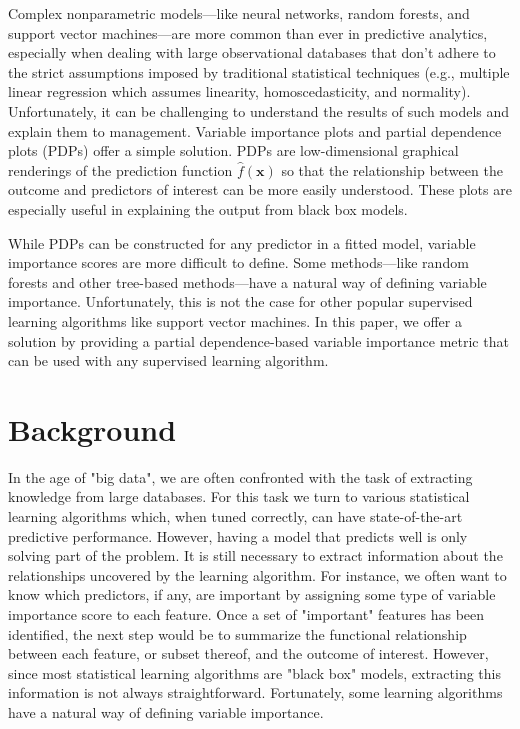 \documentclass[12pt]{article}
\begin{document}
Complex nonparametric models---like neural networks, random forests, and support vector machines---are more common than ever in predictive analytics, especially when dealing with large observational databases that don't adhere to the strict assumptions imposed by traditional statistical techniques (e.g., multiple linear regression which assumes linearity, homoscedasticity, and normality). Unfortunately, it can be challenging to understand the results of such models and explain them to management. Variable importance plots and partial dependence plots (PDPs) offer a simple solution. PDPs are low-dimensional graphical renderings of the prediction function $\widehat{f}\left(\boldsymbol{x}\right)$ so that the relationship between the outcome and predictors of interest can be more easily understood. These plots are especially useful in explaining the output from black box models.

While PDPs can be constructed for any predictor in a fitted model, variable importance scores are more difficult to define. Some methods---like random forests and other tree-based methods---have a natural way of defining variable importance. Unfortunately, this is not the case for other popular supervised learning algorithms like support vector machines. In this paper, we offer a solution by providing a partial dependence-based variable importance metric that can be used with any supervised learning algorithm.


\section{Background}
\label{sec:background}

In the age of "big data", we are often confronted with the task of extracting knowledge from large databases. For this task we turn to various statistical learning algorithms which, when tuned correctly, can have state-of-the-art predictive performance. However, having a model that predicts well is only solving part of the problem. It is still necessary to extract information about the relationships uncovered by the learning algorithm. For instance, we often want to know which predictors, if any, are important by assigning some type of variable importance score to each feature. Once a set of "important" features has been identified, the next step would be to summarize the functional relationship between each feature, or subset thereof, and the outcome of interest. However, since most statistical learning algorithms are "black box" models, extracting this information is not always straightforward. Fortunately, some learning algorithms have a natural way of defining variable importance.
\end{document}
